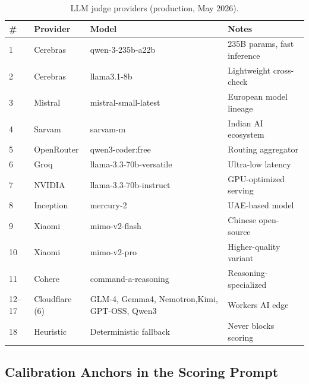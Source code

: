 \documentclass[11pt,a4paper]{article}
\theoremstyle{plain}
\theoremstyle{definition}
\theoremstyle{remark}
\begin{document}
\begin{table}[ht]
\centering
\caption{LLM judge providers (production, May 2026).}
\label{tab:judges}
\small\begin{tabular}{@{}p{0.4cm}lp{4cm}l@{}}
\toprule
\textbf{\#} & \textbf{Provider} & \textbf{Model} & \textbf{Notes} \\
\midrule
1  & Cerebras    & qwen-3-235b-a22b          & 235B params, fast inference \\
2  & Cerebras    & llama3.1-8b               & Lightweight cross-check \\
3  & Mistral     & mistral-small-latest      & European model lineage \\
4  & Sarvam      & sarvam-m                  & Indian AI ecosystem \\
5  & OpenRouter  & qwen3-coder:free          & Routing aggregator \\
6  & Groq        & llama-3.3-70b-versatile   & Ultra-low latency \\
7  & NVIDIA      & llama-3.3-70b-instruct    & GPU-optimized serving \\
8  & Inception   & mercury-2                 & UAE-based model \\
9  & Xiaomi      & mimo-v2-flash             & Chinese open-source \\
10 & Xiaomi      & mimo-v2-pro               & Higher-quality variant \\
11 & Cohere      & command-a-reasoning       & Reasoning-specialized \\
12--17 & Cloudflare (6) & GLM-4, Gemma4, Nemotron,\newline Kimi, GPT-OSS, Qwen3 & Workers AI edge \\
18 & Heuristic   & Deterministic fallback    & Never blocks scoring \\
\bottomrule
\end{tabular}
\end{table}

\subsection{Calibration Anchors in the Scoring Prompt}
\end{document}

